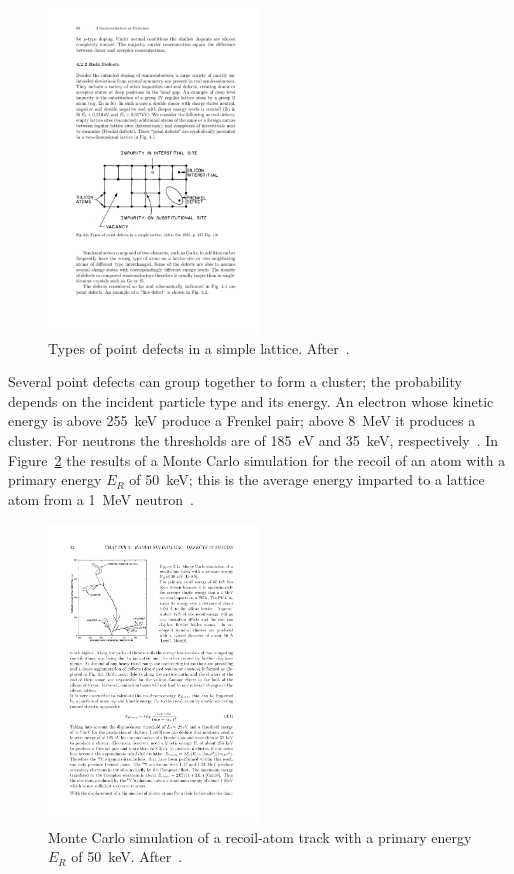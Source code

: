\begin{figure}[!htbp]
\centering
\includegraphics[width=0.5\textwidth]{Interstitial.pdf}
\caption{\label{fig:Interstitial}Types of point defects in a simple lattice. After~\cite{Lutz:411172}.}
\end{figure}


Several point defects can group together to form a cluster; the probability 
depends on the incident particle type and its energy. 
An electron whose kinetic energy is above 255~keV produce a Frenkel pair; above 8~MeV it 
produces a cluster. For neutrons the thresholds are of 185~eV and 35~keV, 
respectively~\cite{moll-thesis}. In Figure~\ref{fig:clusters} the results of a Monte Carlo simulation 
for the recoil of an atom with a primary energy $E_R$ of 50~keV; this is the average energy imparted 
to a lattice atom from a 1~MeV neutron~\cite{moll-thesis}.


\begin{figure}[!htbp]
\centering
\includegraphics[width=0.5\textwidth]{clusters.pdf}
\caption{\label{fig:clusters}Monte Carlo simulation of a recoil-atom track with a primary energy $E_R$
of 50~keV. After~\cite{van1980mechanisms}.}
\end{figure}

